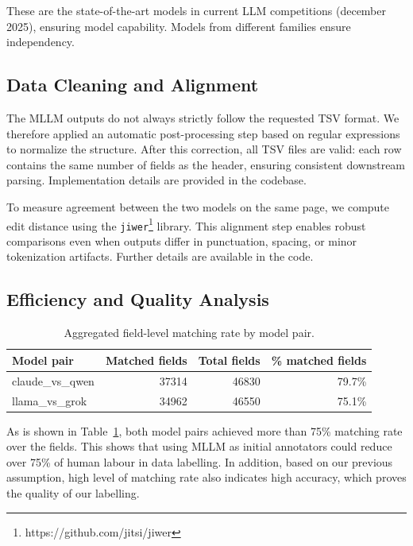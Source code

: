 These are the state-of-the-art models in current LLM competitions (december 2025), ensuring model capability. Models from different families ensure independency.

\subsection{Data Cleaning and Alignment}
The MLLM outputs do not always strictly follow the requested TSV format. We therefore applied an automatic post-processing step based on regular expressions to normalize the structure. After this correction, all TSV files are valid: each row contains the same number of fields as the header, ensuring consistent downstream parsing. Implementation details are provided in the codebase.

To measure agreement between the two models on the same page, we compute edit distance using the \texttt{jiwer}\footnote{https://github.com/jitsi/jiwer} library. This alignment step enables robust comparisons even when outputs differ in punctuation, spacing, or minor tokenization artifacts. Further details are available in the code.



\subsection{Efficiency and Quality Analysis}

\begin{table}[htbp]
\centering
\caption{Aggregated field-level matching rate by model pair.}
\label{tab:field_iaa_by_pair}
\begin{tabular}{lrrr}
\hline
\textbf{Model pair} & \textbf{Matched fields} & \textbf{Total fields} & \textbf{\% matched fields} \\
\hline
claude\_vs\_qwen & 37314 & 46830 & 79.7\% \\
llama\_vs\_grok  & 34962 & 46550 & 75.1\% \\
\hline
\end{tabular}
\label{tab:field-matching-rate-model-pair}
\end{table}

As is shown in Table~\ref{tab:field-matching-rate-model-pair}, both model pairs achieved more than 75\% matching rate over the fields. This shows that using MLLM as initial annotators could reduce over 75\% of human labour in data labelling. In addition, based on our previous assumption, high level of matching rate also indicates high accuracy, which proves the quality of our labelling.

